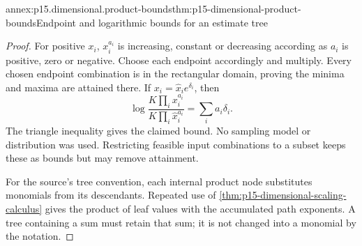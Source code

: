 \begin{annexitem}{annex:p15.dimensional.product-bounds}{thm:p15-dimensional-product-bounds}{Endpoint and logarithmic bounds for an estimate tree}
\begin{proof}
For positive \(x_i\), \(x_i^{a_i}\) is increasing, constant or decreasing
according as \(a_i\) is positive, zero or negative.
Choose each endpoint accordingly and multiply. Every chosen endpoint
combination is in the rectangular domain, proving the minima and maxima
are attained there.
If \(x_i=\widehat x_i e^{\delta_i}\), then
\[
 \log\frac{K\prod_i x_i^{a_i}}{K\prod_i\widehat x_i^{a_i}}
             =\sum_i a_i\delta_i.
\]
The triangle inequality gives the claimed bound.
No sampling model or distribution was used. Restricting feasible input
combinations to a subset keeps these as bounds but may remove attainment.

For the source's tree convention, each internal product node substitutes
monomials from its descendants. Repeated use of
\cref{thm:p15-dimensional-scaling-calculus} gives the product of leaf
values with the accumulated path exponents. A tree containing a sum must
retain that sum; it is not changed into a monomial by the notation.
\end{proof}
\end{annexitem}

